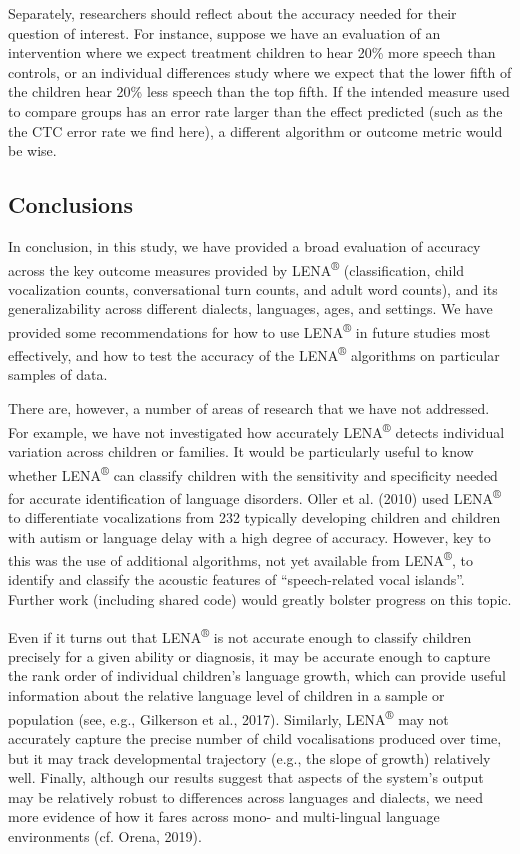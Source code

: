 \documentclass[english,table,man,floatsintext]{apa6}
\begin{document}
Separately, researchers should reflect about the accuracy needed for their question of interest. For instance, suppose we have an evaluation of an intervention where we expect treatment children to hear 20\% more speech than controls, or an individual differences study where we expect that the lower fifth of the children hear 20\% less speech than the top fifth. If the intended measure used to compare groups has an error rate larger than the effect predicted (such as the the CTC error rate we find here), a different algorithm or outcome metric would be wise.

\hypertarget{conclusions}{%
\subsection{Conclusions}\label{conclusions}}

In conclusion, in this study, we have provided a broad evaluation of accuracy across the key outcome measures provided by LENA\textsuperscript{®} (classification, child vocalization counts, conversational turn counts, and adult word counts), and its generalizability across different dialects, languages, ages, and settings. We have provided some recommendations for how to use LENA\textsuperscript{®} in future studies most effectively, and how to test the accuracy of the LENA\textsuperscript{®} algorithms on particular samples of data.

There are, however, a number of areas of research that we have not addressed. For example, we have not investigated how accurately LENA\textsuperscript{®} detects individual variation across children or families. It would be particularly useful to know whether LENA\textsuperscript{®} can classify children with the sensitivity and specificity needed for accurate identification of language disorders. Oller et al. (2010) used LENA\textsuperscript{®} to differentiate vocalizations from 232 typically developing children and children with autism or language delay with a high degree of accuracy. However, key to this was the use of additional algorithms, not yet available from LENA\textsuperscript{®}, to identify and classify the acoustic features of \enquote{speech-related vocal islands}. Further work (including shared code) would greatly bolster progress on this topic.

Even if it turns out that LENA\textsuperscript{®} is not accurate enough to classify children precisely for a given ability or diagnosis, it may be accurate enough to capture the rank order of individual children's language growth, which can provide useful information about the relative language level of children in a sample or population (see, e.g., Gilkerson et al., 2017). Similarly, LENA\textsuperscript{®} may not accurately capture the precise number of child vocalisations produced over time, but it may track developmental trajectory (e.g., the slope of growth) relatively well. Finally, although our results suggest that aspects of the system's output may be relatively robust to differences across languages and dialects, we need more evidence of how it fares across mono- and multi-lingual language environments (cf. Orena, 2019).
\end{document}
